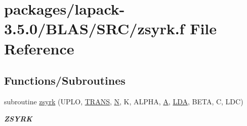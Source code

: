 \hypertarget{lapack-3_85_80_2BLAS_2SRC_2zsyrk_8f}{}\section{packages/lapack-\/3.5.0/\+B\+L\+A\+S/\+S\+R\+C/zsyrk.f File Reference}
\label{lapack-3_85_80_2BLAS_2SRC_2zsyrk_8f}
\subsection*{Functions/\+Subroutines}
\begin{DoxyCompactItemize}
\item 
subroutine \hyperlink{group__complex16__blas__level3_ga3faec48d92afecad0a791157278b184c}{zsyrk} (U\+P\+L\+O, \hyperlink{superlu__enum__consts_8h_a0c4e17b2d5cea33f9991ccc6a6678d62a1f61e3015bfe0f0c2c3fda4c5a0cdf58}{T\+R\+A\+N\+S}, \hyperlink{polmisc_8c_a0240ac851181b84ac374872dc5434ee4}{N}, K, A\+L\+P\+H\+A, \hyperlink{classA}{A}, \hyperlink{example__user_8c_ae946da542ce0db94dced19b2ecefd1aa}{L\+D\+A}, B\+E\+T\+A, C, L\+D\+C)
\begin{DoxyCompactList}\small\item\em {\bfseries Z\+S\+Y\+R\+K} \end{DoxyCompactList}\end{DoxyCompactItemize}
